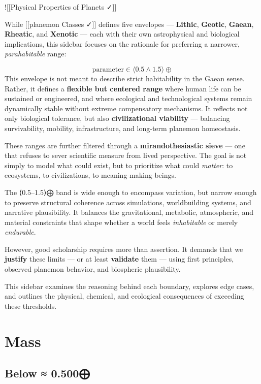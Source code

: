 \documentclass[
  letterpaper,
]{book}
\begin{document}
!{[}{[}Physical Properties of Planets ✓{]}{]}

While {[}{[}planemon Classes ✓{]}{]} defines five envelopes ---
\textbf{Lithic}, \textbf{Geotic}, \textbf{Gaean}, \textbf{Rheatic}, and
\textbf{Xenotic} --- each with their own astrophysical and biological
implications, this sidebar focuses on the rationale for preferring a
narrower, \emph{parahabitable} range:

\[\text{parameter} \in \langle0.5 \wedge 1.5\rangle\oplus\] This
envelope is not meant to describe strict habitability in the Gaean
sense. Rather, it defines a \textbf{flexible but centered range} where
human life can be sustained or engineered, and where ecological and
technological systems remain dynamically stable without extreme
compensatory mechanisms. It reflects not only biological tolerance, but
also \textbf{civilizational viability} --- balancing survivability,
mobility, infrastructure, and long-term planemon homeostasis.

These ranges are further filtered through a \textbf{mirandothesiastic
sieve} --- one that refuses to sever scientific measure from lived
perspective. The goal is not simply to model what could exist, but to
prioritize what could \emph{matter}: to ecosystems, to civilizations, to
meaning-making beings.

The ⟨0.5--1.5⟩⨁ band is wide enough to encompass variation, but narrow
enough to preserve structural coherence across simulations,
worldbuilding systems, and narrative plausibility. It balances the
gravitational, metabolic, atmospheric, and material constraints that
shape whether a world feels \emph{inhabitable} or merely
\emph{endurable}.

However, good scholarship requires more than assertion. It demands that
we \textbf{justify} these limits --- or at least \textbf{validate} them
--- using first principles, observed planemon behavior, and biospheric
plausibility.

This sidebar examines the reasoning behind each boundary, explores edge
cases, and outlines the physical, chemical, and ecological consequences
of exceeding these thresholds.

\chapter{Mass}\label{mass}

\section{Below ≈ 0.500⨁}\label{below-0.500}
\end{document}
